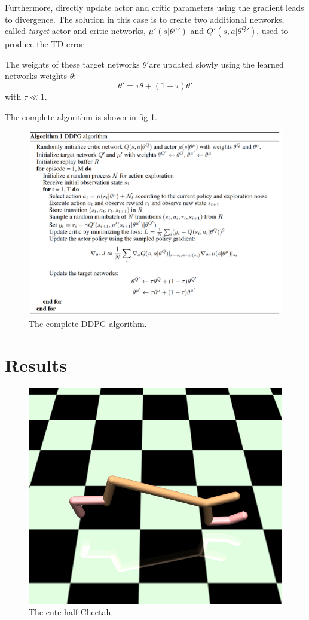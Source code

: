 \documentclass[10pt,a4paper]{scrartcl}
\begin{document}
Furthermore, directly update actor and critic parameters using the gradient leads to divergence. The solution in this case is to create two additional networks, called \textit{target} actor and critic networks, $ \mu{'}(s|\theta^\mu{'}) $ and $ Q{'}(s,a|\theta^Q{'}) $, used to produce the TD error. 

The weights of these target networks $ \theta{'} $are updated slowly using the learned networks weights $ \theta $:
\begin{equation}
	\theta{'} = \tau \theta + (1 - \tau)\theta{'}
\end{equation}
with $ \tau \ll 1 $.

The complete algorithm is shown in fig \ref{fig:algo}.

\begin{figure}[h]
	\centering
	\includegraphics[width=0.8\linewidth]{images/algo}
	\caption{The complete DDPG algorithm.}
	\label{fig:algo}
\end{figure}
 

\section{Results}

\begin{figure}[h]
	\centering
	\includegraphics[width=0.5\linewidth]{images/cheetah}
	\caption{The cute half Cheetah.}
	\label{fig:cheetah}
\end{figure}
\end{document}
